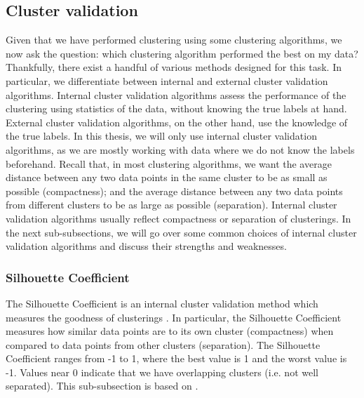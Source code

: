 \subsection{Cluster validation}
\label{sec:cluster-validation}
Given that we have performed clustering using some clustering algorithms, we now ask the question: which clustering algorithm performed the best on my data? Thankfully, there exist a handful of various methods designed for this task. In particular, we differentiate between internal and external cluster validation algorithms. Internal cluster validation algorithms assess the performance of the clustering using statistics of the data, without knowing the true labels at hand. External cluster validation algorithms, on the other hand, use the knowledge of the true labels. In this thesis, we will only use internal cluster validation algorithms, as we are mostly working with data where we do not know the labels beforehand. Recall that, in most clustering algorithms, we want the average distance between any two data points in the same cluster to be as small as possible (compactness); and the average distance between any two data points from different clusters to be as large as possible (separation). Internal cluster validation algorithms usually reflect compactness or separation of clusterings. In the next sub-subsections, we will go over some common choices of internal cluster validation algorithms and discuss their strengths and weaknesses.

\subsubsection{Silhouette Coefficient}
\label{sec:silhouette-coefficient}
The Silhouette Coefficient is an internal cluster validation method which measures the goodness of clusterings \cite[p. 87]{Kaufman1990}. In particular, the Silhouette Coefficient measures how similar data points are to its own cluster (compactness) when compared to data points from other clusters (separation). The Silhouette Coefficient ranges from -1 to 1, where the best value is 1 and the worst value is -1. Values near 0 indicate that we have overlapping clusters (i.e. not well separated). This sub-subsection is based on \cite[p. 87]{Kaufman1990}.

